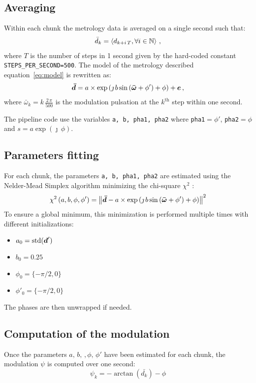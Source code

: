 \documentclass[a4paper,11pt,twoside]{scrartcl}
\begin{document}
\subsection{Averaging}
Within each chunk the metrology data is averaged on a single second such that:
\begin{equation}
    \bar{d}_k = \left\langle d_{k+i\,T}, \forall i\in \mathbb{N}\right\rangle\,,
\end{equation}
where $T$ is the number of steps in 1 second given by the hard-coded constant \verb|STEPS_PER_SECOND=500|.
The model of the metrology described equation~\ref{eq:model} is rewritten as:
\begin{equation}
    \boldsymbol{\bar{d}} = a \times  \exp\left( \jmath \, b \sin\left( \boldsymbol{\bar{\omega}} + \phi'\right) + \phi\right)+  \boldsymbol{e}\,,\label{eq:modelpip}
\end{equation}
where $\bar{\omega}_k = k\,\frac{2\,\pi}{500}$ is the modulation pulsation at the $k^\textrm{th}$ step within one second.

The pipeline code use the variables \verb+a, b, pha1, pha2+ where \verb|pha1|$=\phi'$, \verb|pha2|$=\phi$ and $s = a \exp(\jmath\,\phi)$.


\subsection{Parameters fitting}
For each chunk, the parameters \verb+a, b, pha1, pha2+ are estimated using the Nelder-Mead Simplex algorithm minimizing the chi-square $\chi^2$ :
\begin{equation}
    \chi^2 \left( a, b, \phi, \phi' \right) =   \left\Vert \boldsymbol{\bar{d}} -  a \times  \exp\left( \jmath \, b \sin\left( \boldsymbol{\bar{\omega}} + \phi' \right) + \phi \right)\right\Vert^2
\end{equation}
To ensure a global minimum, this minimization is performed multiple times with different initializations:
\begin{itemize}
    \item $a_0 = \mathrm{std}(\boldsymbol{d}')$
    \item $b_0 = 0.25$
    \item $\phi_0 = \{-\pi/2, 0\} $
    \item $\phi'_0 = \{-\pi/2, 0\} $
\end{itemize}
The phases are then unwrapped if needed.

\subsection{Computation of the modulation}
Once the parameters $a,\,b,\,,\phi,\,\phi'$ have been estimated for each chunk, the modulation $\psi$ is computed over one second:
\begin{equation}
   \psi_k =  -\arctan(\bar{d_k}) - \phi
\end{equation}
\end{document}
